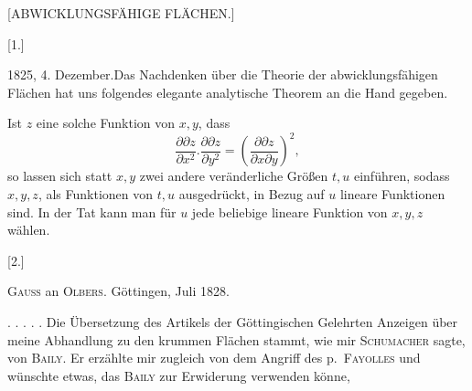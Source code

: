 \clearpage
{}
\begin{center}\large [ABWICKLUNGSFÄHIGE FLÄCHEN.]\end{center}
\begin{center}[1.]\end{center}
\noindent\hspace*{1.2em}1825, 4. Dezember.\quad Das Nachdenken über die Theorie der abwicklungsfähigen Flächen hat uns folgendes elegante analytische Theorem an die Hand gegeben.

Ist $z$ eine solche Funktion von $x,y$, dass
\[
\frac{\partial\partial z}{\partial x^2}.\frac{\partial\partial z}{\partial y^2}
=\left(\frac{\partial\partial z}{\partial x\partial y}\right)^2,
\]
\noindent so lassen sich statt $x,y$ zwei andere veränderliche Größen $t,u$ einführen, sodass $x,y,z$, als Funktionen von $t,u$ ausgedrückt, in Bezug auf $u$ lineare Funktionen sind. In der Tat kann man für $u$ jede beliebige lineare Funktion von $x,y,z$ wählen.

\begin{center}[2.]\end{center}
\begin{center}\textsc{Gauss} an \textsc{Olbers}. Göttingen, Juli 1828.\end{center}
\noindent\hspace*{1.2em}. . . . . Die Übersetzung des Artikels der Göttingischen Gelehrten Anzeigen über meine Abhandlung zu den krummen Flächen stammt, wie mir \textsc{Schumacher} sagte, von \textsc{Baily}. Er erzählte mir zugleich von dem Angriff des p.\ \textsc{Fayolles} und wünschte etwas, das \textsc{Baily} zur Erwiderung verwenden könne,
